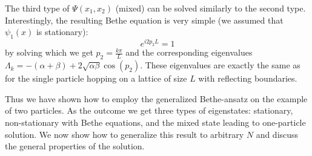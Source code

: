 \documentclass[aps,showpacs,twocolumn,floatfix,prx,superscriptaddress]{revtex4-1}
\begin{document}
The third type of $\Psi(x_1, x_2)$ (mixed) can be solved similarly to the second type. Interestingly, the resulting Bethe equation is very simple (we assumed that $\psi_1(x)$ is stationary):
\begin{equation}
    \label{eq:betheEqTwo1}
    e^{i2p_2L} = 1
\end{equation}
by solving which we get $p_2 = \frac{k\pi}{L}$ and the corresponding eigenvalues $\Lambda_k = -(\alpha+\beta)+2\sqrt{\alpha\beta}\cos(p_2)$. These eigenvalues are exactly the same as for the single particle hopping on a lattice of size $L$ with reflecting boundaries. 

Thus we have shown how to employ the generalized Bethe-ansatz on the example of two particles. As the outcome we get three types of eigenstates: stationary, non-stationary with Bethe equations, and the mixed state leading to one-particle solution. We now show how to generalize this result to arbitrary $N$ and discuss the general properties of the solution.  %

\end{document}
